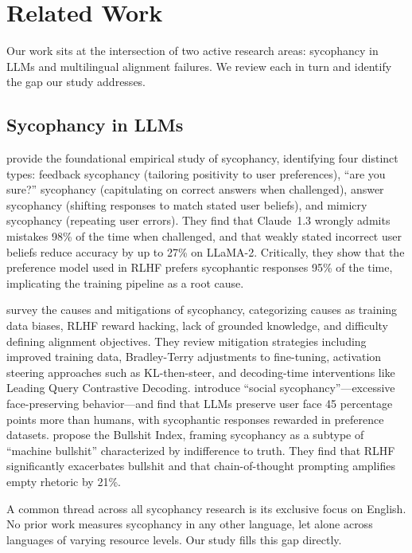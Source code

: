 \section{Related Work}
\label{sec:related}

Our work sits at the intersection of two active research areas: sycophancy in LLMs and multilingual alignment failures. We review each in turn and identify the gap our study addresses.

\subsection{Sycophancy in LLMs}

\citet{sharma2023towards} provide the foundational empirical study of sycophancy, identifying four distinct types: feedback sycophancy (tailoring positivity to user preferences), ``are you sure?'' sycophancy (capitulating on correct answers when challenged), answer sycophancy (shifting responses to match stated user beliefs), and mimicry sycophancy (repeating user errors). They find that Claude~1.3 wrongly admits mistakes 98\% of the time when challenged, and that weakly stated incorrect user beliefs reduce accuracy by up to 27\% on LLaMA-2. Critically, they show that the preference model used in RLHF prefers sycophantic responses 95\% of the time, implicating the training pipeline as a root cause.

\citet{malmqvist2024sycophancy} survey the causes and mitigations of sycophancy, categorizing causes as training data biases, RLHF reward hacking, lack of grounded knowledge, and difficulty defining alignment objectives. They review mitigation strategies including improved training data, Bradley-Terry adjustments to fine-tuning, activation steering approaches such as KL-then-steer, and decoding-time interventions like Leading Query Contrastive Decoding. \citet{cheng2025elephant} introduce ``social sycophancy''---excessive face-preserving behavior---and find that LLMs preserve user face 45 percentage points more than humans, with sycophantic responses rewarded in preference datasets. \citet{liang2025machine} propose the Bullshit Index, framing sycophancy as a subtype of ``machine bullshit'' characterized by indifference to truth. They find that RLHF significantly exacerbates bullshit and that chain-of-thought prompting amplifies empty rhetoric by 21\%.

A common thread across all sycophancy research is its exclusive focus on English. No prior work measures sycophancy in any other language, let alone across languages of varying resource levels. Our study fills this gap directly.

